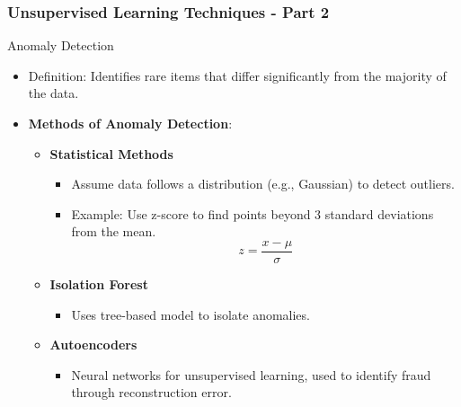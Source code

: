 \documentclass[aspectratio=169]{beamer}
\begin{document}
\begin{frame}[fragile]
    \frametitle{Unsupervised Learning Techniques - Part 2}
    \begin{block}{Anomaly Detection}
        \begin{itemize}
            \item Definition: Identifies rare items that differ significantly from the majority of the data.
            \item \textbf{Methods of Anomaly Detection}:
            \begin{itemize}
                \item \textbf{Statistical Methods}
                \begin{itemize}
                    \item Assume data follows a distribution (e.g., Gaussian) to detect outliers.
                    \item Example: Use z-score to find points beyond 3 standard deviations from the mean.
                    \begin{equation}
                     z = \frac{x - \mu}{\sigma}
                    \end{equation}
                \end{itemize}
                \item \textbf{Isolation Forest}
                \begin{itemize}
                    \item Uses tree-based model to isolate anomalies.
                \end{itemize}
                \item \textbf{Autoencoders}
                \begin{itemize}
                    \item Neural networks for unsupervised learning, used to identify fraud through reconstruction error.
                \end{itemize}
            \end{itemize}
        \end{itemize}
    \end{block}
\end{frame}
\end{document}
